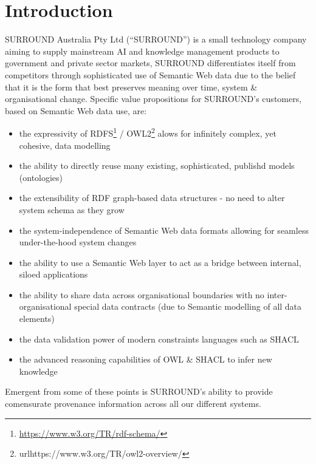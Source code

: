 \documentclass[letterpaper,twocolumn,10pt]{article}
\begin{document}
\section{Introduction}
SURROUND Australia Pty Ltd (``SURROUND'') is a small technology company
aiming to supply mainstream AI and knowledge management products to government and private
sector markets, SURROUND differentiates itself from competitors through sophisticated use
of Semantic Web data due to the belief that it is the form that best preserves meaning 
over time, system \& organisational change. Specific value propositions for SURROUND's customers, 
based on Semantic Web data use, are:

\begin{itemize}
  \item the expressivity of RDFS\footnote{\url{https://www.w3.org/TR/rdf-schema/}} / OWL2\footnote{url{https://www.w3.org/TR/owl2-overview/}} alows for infinitely complex, yet cohesive, data modelling
  \item the ability to directly reuse many existing, sophisticated, publishd models (ontologies)
  \item the extensibility of RDF graph-based data structures - no need to alter system schema as they grow
  \item the system-independence of Semantic Web data formats allowing for seamless under-the-hood system changes
  \item the ability to use a Semantic Web layer to act as a bridge between internal, siloed applications
  \item the ability to share data across organisational boundaries with no inter-organisational special data contracts (due to Semantic modelling of all data elements)
  \item the data validation power of modern constraints languages such as SHACL~\cite{knublauch_shapes_2017}
  \item the advanced reasoning capabilities of OWL \& SHACL to infer new knowledge
\end{itemize}

Emergent from some of these points is SURROUND's ability to provide comensurate provenance information 
across all our different systems.

\end{document}
